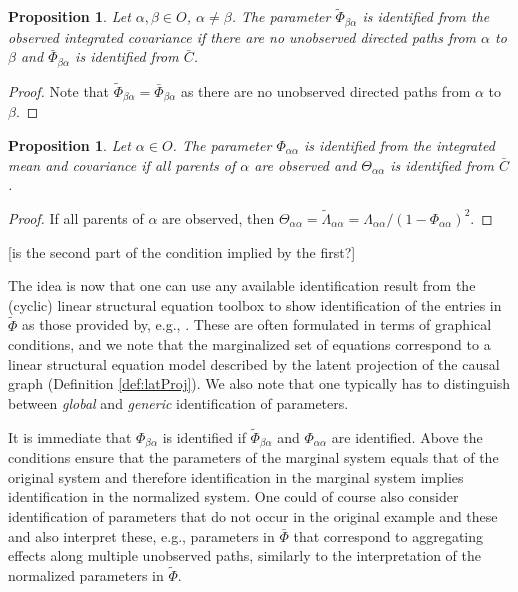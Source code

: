 \documentclass[accepted]{uai2021} %
\newtheorem{prop}[thm]{Proposition}
\begin{document}
\begin{prop}
	Let $\alpha,\beta \in O$, $\alpha\neq \beta$. The parameter 
	$\tilde{\Phi}_{\beta\alpha}$ is 
	identified 
	from the observed integrated covariance if there 
	are no unobserved directed paths from 
	$\alpha$ to $\beta$ and $\bar{\Phi}_{\beta\alpha}$ is identified from 
	$\bar{C}$.
\end{prop}

\begin{proof}
	Note that $\tilde{\Phi}_{\beta\alpha} = \bar{\Phi}_{\beta\alpha}$ as there 
	are no 
	unobserved directed paths from $\alpha$ to $\beta$.
\end{proof}

\begin{prop}
	Let $\alpha\in O$. The parameter $\Phi_{\alpha\alpha}$ is identified from 
	the 
	integrated mean and covariance if all 
	parents of $\alpha$ are observed and $\Theta_{\alpha\alpha}$ is identified 
	from 
	$\bar{C}$.
\end{prop}

\begin{proof}
	If all parents of $\alpha$ are observed, then $\Theta_{\alpha\alpha} = 
	\tilde{\Lambda}_{\alpha\alpha} = \Lambda_{\alpha\alpha}/(1 - 
	\Phi_{\alpha\alpha})^2$.
\end{proof}

[is the second part of the condition implied by the first?]

The idea is now 
that one can use any available identification result from the (cyclic) linear 
structural equation toolbox to show identification of the entries in 
$\tilde{\Phi}$ as those provided by, e.g., \cite{foygelHalftrek2012, 
chenNIPS2016, 
weihs2018}. 
These are often 
formulated in terms of graphical 
conditions, and we note that the 
marginalized set of equations correspond to a linear structural 
equation model described by the latent projection of the causal graph 
(Definition \ref{def:latProj}). We also note that one typically has to 
distinguish between \emph{global} and \emph{generic} identification of 
parameters.


It is immediate that $\Phi_{\beta\alpha}$ is identified if 
$\tilde{\Phi}_{\beta\alpha}$ and $\Phi_{\alpha\alpha}$ are identified. Above 
the 
conditions ensure that the parameters of the marginal system equals that of the 
original system and therefore identification in the marginal system implies 
identification in the normalized system. One could of course also consider 
identification of parameters that do not occur in the original example and 
these and also interpret these, e.g., parameters in $\bar{\Phi}$ that 
correspond to aggregating effects along multiple unobserved paths, similarly to 
the 
interpretation of the normalized parameters in $\tilde{\Phi}$.
\end{document}
